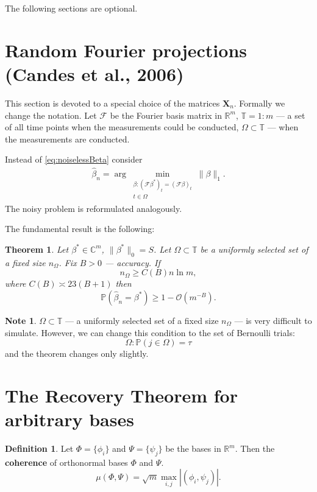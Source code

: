 \documentclass[11pt]{article}
\numberwithin{equation}{section}
\newtheorem{theorem}{Theorem}[section]
\theoremstyle{definition}
\newtheorem{remark}{Note}[section]
\newtheorem{definition}{Definition}[section]
\begin{document}
\begin{center}
    \color{red}
    The following sections are optional.
\end{center}
\small {
\section{Random Fourier projections (Candes et al., 2006)}

This section is devoted to a special choice of the matrices $\mathbf X_n$.
Formally we change the notation.
Let $\mathcal F$ be the Fourier basis matrix in $\mathbb R^m$, $\mathbb T = 1:m$ --- a set of all time points when the measurements could be conducted, $\Omega \subset \mathbb T$ --- when the measurements are conducted.

Instead of \eqref{eq:noiselessBeta} consider
\begin{gather}
    \hat \beta_n = \arg \min_{\substack{\beta: (\mathcal F \beta^*)_t = (\mathcal F \beta)_t \\ t \in \Omega}} \|\beta\|_1.
\end{gather}
The noisy problem is reformulated analogously.

The fundamental result is the following:
\begin{theorem}
    Let $\beta^* \in \mathbb C^m$, $\|\beta^*\|_0 = S$. Let $\Omega \subset \mathbb T$ be a uniformly selected set of a fixed size $n_\Omega$.
    Fix $B > 0$ --- accuracy.
    If
    $$ n_\Omega \geq C(B) n \ln m, $$
    where $C(B) \asymp 23(B + 1)$ then
    $$ \mathbb P(\hat \beta_n = \beta^*) \geq 1 - \mathcal O(m^{-B}). $$
\end{theorem}

\begin{remark}
    $\Omega \subset \mathbb T$ --- a uniformly selected set of a fixed size $n_\Omega$ --- is very difficult to simulate.
    However, we can change this condition to the set of Bernoulli trials:
    $$ \Omega: \mathbb P(j \in \Omega) = \tau $$
    and the theorem changes only slightly.
\end{remark}

\section{The Recovery Theorem for arbitrary bases}

\begin{definition}
    Let $\Phi = \{\phi_i\}$ and $\Psi = \{\psi_j\}$ be the bases in $\mathbb R^m$.
    Then the \textbf{coherence} of orthonormal bases $\Phi$ and $\Psi$.
    $$ \mu(\Phi, \Psi) = \sqrt{m} \max_{i, j} |(\phi_i, \psi_j)|. $$
\end{definition}

}
\end{document}
